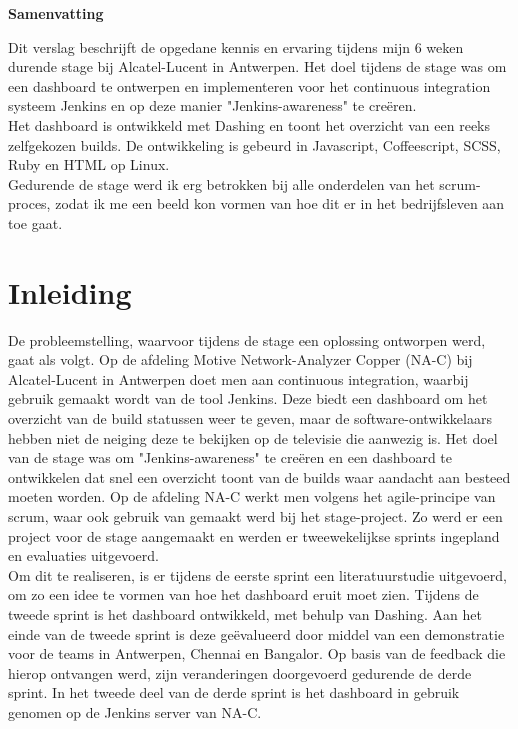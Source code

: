 \documentclass[10pt,a4paper]{article}
\begin{document}
\begin{center}
\textbf{Samenvatting}\\
\end{center}
Dit verslag beschrijft de opgedane kennis en ervaring tijdens mijn 6 weken durende stage bij Alcatel-Lucent in Antwerpen. Het doel tijdens de stage was om een dashboard te ontwerpen en implementeren voor het continuous integration systeem Jenkins en op deze manier "Jenkins-awareness" te cre\"eren.\\
Het dashboard is ontwikkeld met Dashing en toont het overzicht van een reeks zelfgekozen builds. De ontwikkeling is gebeurd in Javascript, Coffeescript, SCSS, Ruby en HTML op Linux.\\
Gedurende de stage werd ik erg betrokken bij alle onderdelen van het scrum-proces, zodat ik me een beeld kon vormen van hoe dit er in het bedrijfsleven aan toe gaat.  

\tableofcontents
\clearpage

\section{Inleiding}
De probleemstelling, waarvoor tijdens de stage een oplossing ontworpen werd, gaat als volgt. Op de afdeling Motive Network-Analyzer Copper (NA-C) bij Alcatel-Lucent in Antwerpen doet men aan continuous integration, waarbij gebruik gemaakt wordt van de tool Jenkins. Deze biedt een dashboard om het overzicht van de build statussen weer te geven, maar de software-ontwikkelaars hebben niet de neiging deze te bekijken op de televisie die aanwezig is. Het doel van de stage was om "Jenkins-awareness" te cre\"eren en een dashboard te ontwikkelen dat snel een overzicht toont van de builds waar aandacht aan besteed moeten worden. Op de afdeling NA-C werkt men volgens het agile-principe van scrum, waar ook gebruik van gemaakt werd bij het stage-project. Zo werd er een project voor de stage aangemaakt en werden er tweewekelijkse sprints ingepland en evaluaties uitgevoerd.\\

Om dit te realiseren, is er tijdens de eerste sprint een literatuurstudie uitgevoerd, om zo een idee te vormen van hoe het dashboard eruit moet zien. Tijdens de tweede sprint is het dashboard ontwikkeld, met behulp van Dashing. Aan het einde van de tweede sprint is deze ge\"evalueerd door middel van een demonstratie voor de teams in Antwerpen, Chennai en Bangalor. Op basis van de feedback die hierop ontvangen werd, zijn veranderingen doorgevoerd gedurende de derde sprint. In het tweede deel van de derde sprint is het dashboard in gebruik genomen op de Jenkins server van NA-C.\\
\end{document}
